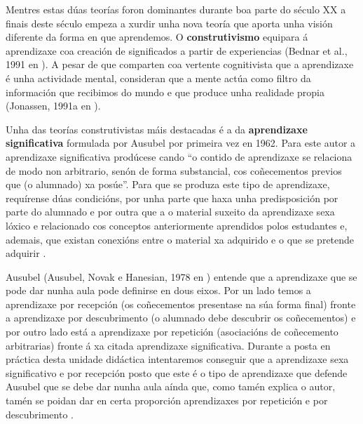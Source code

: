 Mentres estas dúas teorías foron dominantes durante boa parte do século XX a finais deste século empeza a xurdir unha nova teoría que aporta unha visión diferente da forma en que aprendemos. O \textbf{construtivismo} equipara á aprendizaxe coa creación de significados a partir de experiencias (Bednar et al., 1991 en ). A pesar de que comparten coa vertente cognitivista que a aprendizaxe é unha actividade mental, consideran que a mente actúa como filtro da información que recibimos do mundo e que produce unha realidade propia (Jonassen, 1991a en ).

Unha das teorías construtivistas máis destacadas é a da \textbf{aprendizaxe significativa} formulada por Ausubel por primeira vez en 1962. Para este autor a aprendizaxe significativa prodúcese cando ``o contido de aprendizaxe se relaciona de modo non arbitrario, senón de forma substancial, cos coñecementos previos que (o alumnado) xa posúe''\cite[p.~206]{unedpsicoedu}. Para que se produza este tipo de aprendizaxe, requírense dúas condicións, por unha parte que haxa unha predisposición por parte do alumnado e por outra que a o material suxeito da aprendizaxe sexa lóxico e relacionado cos conceptos anteriormente aprendidos polos estudantes e, ademais, que existan conexións entre o material xa adquirido e o que se pretende adquirir \cite{rodriguez2004teoria}.

Ausubel (Ausubel, Novak e Hanesian, 1978 en ) entende que a aprendizaxe que se pode dar nunha aula pode definirse en dous eixos. Por un lado temos a aprendizaxe por recepción (os coñecementos presentase na súa forma final) fronte a aprendizaxe por descubrimento (o alumnado debe descubrir os coñecementos) e por outro lado está a aprendizaxe por repetición (asociacións de coñecemento arbitrarias) fronte á xa citada aprendizaxe significativa. Durante a posta en práctica desta unidade didáctica intentaremos conseguir que a aprendizaxe sexa significativo e por recepción posto que este é o tipo de aprendizaxe que defende Ausubel que se debe dar nunha aula aínda que, como tamén explica o autor, tamén se poidan dar en certa proporción aprendizaxes por repetición e por descubrimento \cite{unedpsicoedu}.
